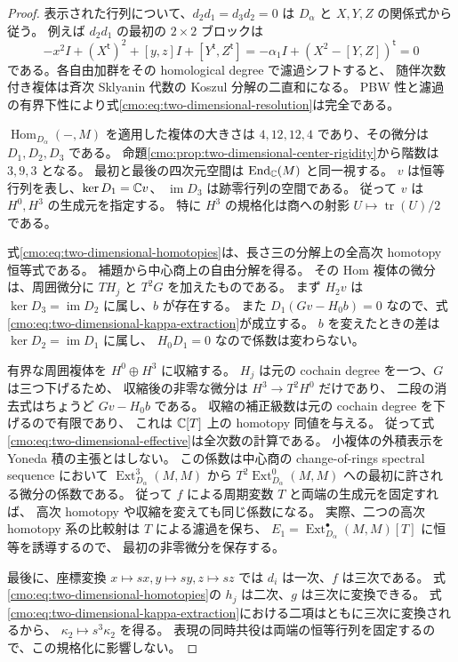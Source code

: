 \begin{proof}
表示された行列について、$d_2d_1=d_3d_2=0$ は
$D_\alpha$ と $X,Y,Z$ の関係式から従う。
例えば $d_2d_1$ の最初の $2\times2$ ブロックは
\[
 -x^2I+(X^{\mathsf t})^2+[y,z]I+[Y^{\mathsf t},Z^{\mathsf t}]
 =-\alpha_1I+(X^2-[Y,Z])^{\mathsf t}=0
\]
である。各自由加群をその homological degree で濾過シフトすると、
随伴次数付き複体は斉次 Sklyanin 代数の Koszul 分解の二直和になる。
PBW 性と濾過の有界下性により式\eqref{cmo:eq:two-dimensional-resolution}は完全である。

$\operatorname{Hom}_{D_\alpha}(-,M)$ を適用した複体の大きさは
$4,12,12,4$ であり、その微分は $D_1,D_2,D_3$ である。
命題\ref{cmo:prop:two-dimensional-center-rigidity}から階数は $3,9,3$ となる。
最初と最後の四次元空間は $\operatorname{End}_{\mathbb C}(M)$ と同一視する。
$v$ は恒等行列を表し、$\ker D_1=\mathbb C v$、
$\operatorname{im}D_3$ は跡零行列の空間である。
従って $v$ は $H^0,H^3$ の生成元を指定する。
特に $H^3$ の規格化は商への射影 $U\mapsto\operatorname{tr}(U)/2$ である。

式\eqref{cmo:eq:two-dimensional-homotopies}は、長さ三の分解上の全高次 homotopy 恒等式である。
補題から中心商上の自由分解を得る。
その Hom 複体の微分は、周囲微分に $TH_j$ と $T^2G$ を加えたものである。
まず $H_2v$ は $\ker D_3=\operatorname{im}D_2$ に属し、$b$ が存在する。
また $D_1(Gv-H_0b)=0$ なので、式\eqref{cmo:eq:two-dimensional-kappa-extraction}が成立する。
$b$ を変えたときの差は $\ker D_2=\operatorname{im}D_1$ に属し、
$H_0D_1=0$ なので係数は変わらない。

有界な周囲複体を $H^0\oplus H^3$ に収縮する。
$H_j$ は元の cochain degree を一つ、$G$ は三つ下げるため、
収縮後の非零な微分は $H^3\to T^2H^0$ だけであり、
二段の消去式はちょうど $Gv-H_0b$ である。
収縮の補正級数は元の cochain degree を下げるので有限であり、
これは $\mathbb C[T]$ 上の homotopy 同値を与える。
従って式\eqref{cmo:eq:two-dimensional-effective}は全次数の計算である。
小複体の外積表示を Yoneda 積の主張とはしない。
この係数は中心商の change-of-rings spectral sequence において
$\operatorname{Ext}^3_{D_\alpha}(M,M)$ から
$T^2\operatorname{Ext}^0_{D_\alpha}(M,M)$ への最初に許される微分の係数である。
従って $f$ による周期変数 $T$ と両端の生成元を固定すれば、
高次 homotopy や収縮を変えても同じ係数になる。
実際、二つの高次 homotopy 系の比較射は $T$ による濾過を保ち、
$E_1=\operatorname{Ext}_{D_\alpha}^{\bullet}(M,M)[T]$ に恒等を誘導するので、
最初の非零微分を保存する。

最後に、座標変換 $x\mapsto sx,y\mapsto sy,z\mapsto sz$ では
$d_i$ は一次、$f$ は三次である。
式\eqref{cmo:eq:two-dimensional-homotopies}の $h_j$ は二次、$g$ は三次に変換できる。
式\eqref{cmo:eq:two-dimensional-kappa-extraction}における二項はともに三次に変換されるから、
$\kappa_2\mapsto s^3\kappa_2$ を得る。
表現の同時共役は両端の恒等行列を固定するので、この規格化に影響しない。
\end{proof}

